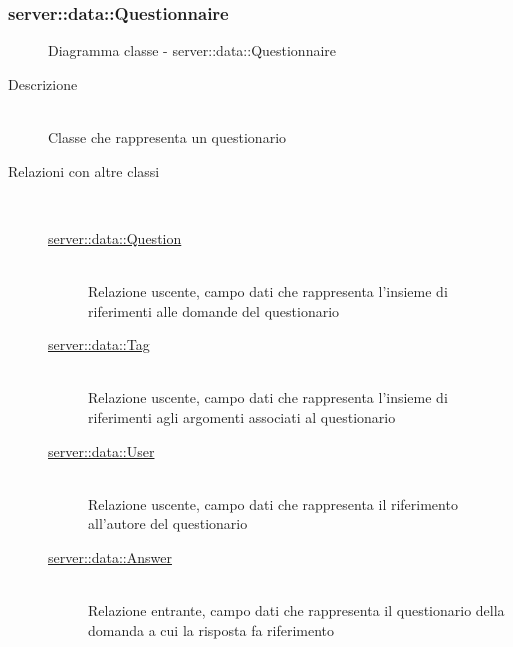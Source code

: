 \subsubsection[Questionnaire]{server::data::Questionnaire}
\begin{figure}[H]
	\centering
	\caption{Diagramma classe - server::data::Questionnaire}
\end{figure}\begin{description}
\item[Descrizione] \hfill \\
Classe che rappresenta un questionario
\item[Relazioni con altre classi] \hfill \\
\vspace{-7mm}
\begin{description}
	\item[\hyperlink{server::data::Question}{server::data::Question}] \hfill \\
	Relazione uscente, campo dati che rappresenta l'insieme di riferimenti alle domande del questionario
	\item[\hyperlink{server::data::Tag}{server::data::Tag}] \hfill \\
	Relazione uscente, campo dati che rappresenta l'insieme di riferimenti agli argomenti associati al questionario
	\item[\hyperlink{server::data::User}{server::data::User}] \hfill \\
	Relazione uscente, campo dati che rappresenta il riferimento all'autore del questionario
	\item[\hyperlink{server::data::Answer}{server::data::Answer}] \hfill \\
	Relazione entrante, campo dati che rappresenta il questionario della domanda a cui la risposta fa riferimento
\end{description}


\end{description}
